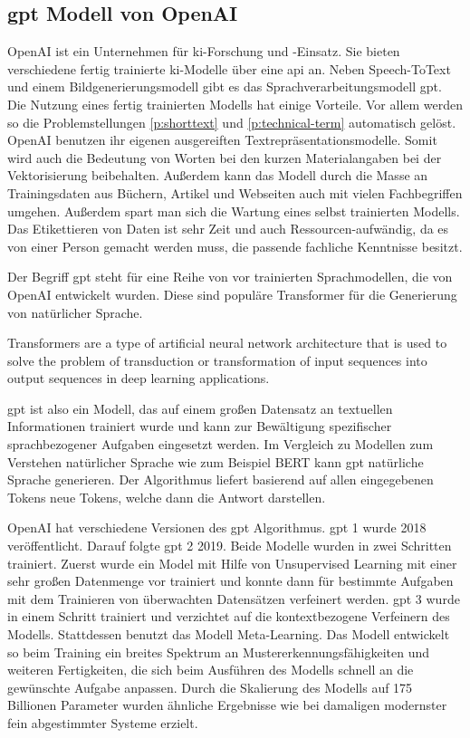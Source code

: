 \subsection{\acf{gpt} Modell von OpenAI}
\label{c:conception:fine-structuring:openai}
OpenAI ist ein Unternehmen für \ac{ki}-Forschung und -Einsatz. Sie bieten verschiedene fertig trainierte \ac{ki}-Modelle über eine \ac{api} an. Neben Speech-ToText und einem Bildgenerierungsmodell gibt es das Sprachverarbeitungsmodell \ac{gpt}.
Die Nutzung eines fertig trainierten Modells hat einige Vorteile. Vor allem werden so die Problemstellungen \ref{p:shorttext} und \ref{p:technical-term} automatisch gelöst. OpenAI benutzen ihr eigenen ausgereiften Textrepräsentationsmodelle. Somit wird auch die Bedeutung von Worten bei den kurzen Materialangaben bei der Vektorisierung beibehalten. Außerdem kann das Modell durch die Masse an Trainingsdaten aus Büchern, Artikel und Webseiten auch mit vielen Fachbegriffen umgehen. Außerdem spart man sich die Wartung eines selbst trainierten Modells. Das Etikettieren von Daten ist sehr Zeit und auch Ressourcen-aufwändig, da es von einer Person gemacht werden muss, die passende fachliche Kenntnisse besitzt.

Der Begriff \ac{gpt} steht für eine Reihe von vor trainierten Sprachmodellen, die von OpenAI entwickelt wurden. Diese sind populäre Transformer für die Generierung von natürlicher Sprache. \citep{zhu_luo_2022}
\begin{definition}[Transformer]
	\glqq Transformers are a type of artificial neural network architecture that is used to solve the problem of transduction or transformation of input sequences into output sequences in deep learning applications. \grqq{} \citep{Rogel-Salazar2022-pd}
\end{definition}
\ac{gpt} ist also ein Modell, das auf einem großen Datensatz an textuellen Informationen trainiert wurde und kann zur Bewältigung spezifischer sprachbezogener Aufgaben eingesetzt werden. Im Vergleich zu Modellen zum Verstehen natürlicher Sprache wie zum Beispiel BERT kann \ac{gpt} natürliche Sprache generieren. Der Algorithmus liefert basierend auf allen eingegebenen Tokens neue Tokens, welche dann die Antwort darstellen. \citep{zhu_luo_2022}

OpenAI hat verschiedene Versionen des \ac{gpt} Algorithmus. \ac{gpt} 1 wurde 2018 veröffentlicht. Darauf folgte \ac{gpt} 2 2019. Beide Modelle wurden in zwei Schritten trainiert. Zuerst wurde ein Model mit Hilfe von Unsupervised Learning mit einer sehr großen Datenmenge vor trainiert und konnte dann für bestimmte Aufgaben mit dem Trainieren von überwachten Datensätzen verfeinert werden. \citep{alec_2018} \ac{gpt} 3 wurde in einem Schritt trainiert und verzichtet auf die kontextbezogene Verfeinern des Modells. \citep{zhu_luo_2022} Stattdessen benutzt das Modell \glqq Meta-Learning\grqq{}. Das Modell entwickelt so beim Training ein breites Spektrum an Mustererkennungsfähigkeiten und weiteren Fertigkeiten, die sich beim Ausführen des Modells schnell an die gewünschte Aufgabe anpassen. 
Durch die Skalierung des Modells auf 175 Billionen Parameter wurden ähnliche Ergebnisse wie bei damaligen modernster fein abgestimmter Systeme erzielt. \citep{brown2020language} 

